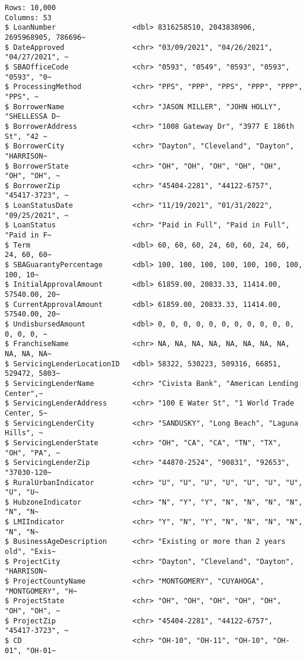\documentclass[
  letterpaper,
  DIV=11,
  numbers=noendperiod]{scrartcl}
\begin{document}
\begin{verbatim}
Rows: 10,000
Columns: 53
$ LoanNumber                  <dbl> 8316258510, 2043838906, 2695968905, 786696~
$ DateApproved                <chr> "03/09/2021", "04/26/2021", "04/27/2021", ~
$ SBAOfficeCode               <chr> "0593", "0549", "0593", "0593", "0593", "0~
$ ProcessingMethod            <chr> "PPS", "PPP", "PPS", "PPP", "PPP", "PPS", ~
$ BorrowerName                <chr> "JASON MILLER", "JOHN HOLLY", "SHELLESSA D~
$ BorrowerAddress             <chr> "1008 Gateway Dr", "3977 E 186th St", "42 ~
$ BorrowerCity                <chr> "Dayton", "Cleveland", "Dayton", "HARRISON~
$ BorrowerState               <chr> "OH", "OH", "OH", "OH", "OH", "OH", "OH", ~
$ BorrowerZip                 <chr> "45404-2281", "44122-6757", "45417-3723", ~
$ LoanStatusDate              <chr> "11/19/2021", "01/31/2022", "09/25/2021", ~
$ LoanStatus                  <chr> "Paid in Full", "Paid in Full", "Paid in F~
$ Term                        <dbl> 60, 60, 60, 24, 60, 60, 24, 60, 24, 60, 60~
$ SBAGuarantyPercentage       <dbl> 100, 100, 100, 100, 100, 100, 100, 100, 10~
$ InitialApprovalAmount       <dbl> 61859.00, 20833.33, 11414.00, 57540.00, 20~
$ CurrentApprovalAmount       <dbl> 61859.00, 20833.33, 11414.00, 57540.00, 20~
$ UndisbursedAmount           <dbl> 0, 0, 0, 0, 0, 0, 0, 0, 0, 0, 0, 0, 0, 0, ~
$ FranchiseName               <chr> NA, NA, NA, NA, NA, NA, NA, NA, NA, NA, NA~
$ ServicingLenderLocationID   <dbl> 58322, 530223, 509316, 66851, 529472, 5803~
$ ServicingLenderName         <chr> "Civista Bank", "American Lending Center",~
$ ServicingLenderAddress      <chr> "100 E Water St", "1 World Trade Center, S~
$ ServicingLenderCity         <chr> "SANDUSKY", "Long Beach", "Laguna Hills", ~
$ ServicingLenderState        <chr> "OH", "CA", "CA", "TN", "TX", "OH", "PA", ~
$ ServicingLenderZip          <chr> "44870-2524", "90831", "92653", "37030-120~
$ RuralUrbanIndicator         <chr> "U", "U", "U", "U", "U", "U", "U", "U", "U~
$ HubzoneIndicator            <chr> "N", "Y", "Y", "N", "N", "N", "N", "N", "N~
$ LMIIndicator                <chr> "Y", "N", "Y", "N", "N", "N", "N", "N", "N~
$ BusinessAgeDescription      <chr> "Existing or more than 2 years old", "Exis~
$ ProjectCity                 <chr> "Dayton", "Cleveland", "Dayton", "HARRISON~
$ ProjectCountyName           <chr> "MONTGOMERY", "CUYAHOGA", "MONTGOMERY", "H~
$ ProjectState                <chr> "OH", "OH", "OH", "OH", "OH", "OH", "OH", ~
$ ProjectZip                  <chr> "45404-2281", "44122-6757", "45417-3723", ~
$ CD                          <chr> "OH-10", "OH-11", "OH-10", "OH-01", "OH-01~

\end{verbatim}
\end{document}
